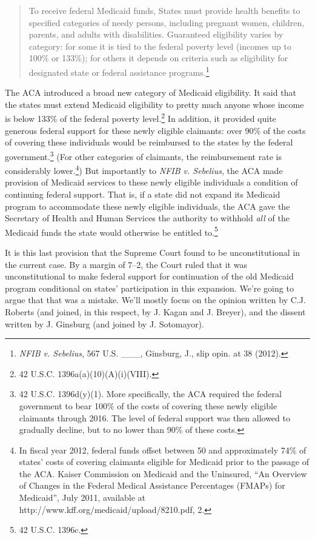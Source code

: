 \begin{quote}
To receive federal Medicaid funds, States must provide health benefits to specified categories of needy persons, including pregnant women, children, parents, and adults with disabilities. Guaranteed eligibility varies by category: for some it is tied to the federal poverty level (incomes up to 100\% or 133\%); for others it depends on criteria such as eligibility for designated state or federal assistance programs.\footnote{\emph{NFIB v. Sebelius}, 567 U.S. \_\_\_, Ginsburg, J., slip opin. at 38 (2012).}
\end{quote}
The ACA introduced a broad new category of Medicaid eligibility. It said that the states must extend Medicaid eligibility to pretty much anyone whose income is below 133\% of the federal poverty level.\footnote{42 U.S.C. \textsection 1396a(a)(10)(A)(i)(VIII).} In addition, it provided quite generous federal support for these newly eligible claimants: over 90\% of the costs of covering these individuals would be reimbursed to the states by the federal government.\footnote{42 U.S.C. \textsection 1396d(y)(1). More specifically, the ACA required the federal government to bear 100\% of the costs of covering these newly eligible claimants through 2016. The level of federal support was then allowed to gradually decline, but to no lower than 90\% of these costs.} (For other categories of claimants, the reimbursement rate is considerably lower.\footnote{In fiscal year 2012, federal funds offset between 50 and approximately 74\% of states' costs of covering claimants eligible for Medicaid prior to the passage of the ACA. Kaiser Commission on Medicaid and the Uninsured, ``An Overview of Changes in the Federal Medical Assistance Percentages (FMAPs) for Medicaid'', July 2011, available at http:/\slash www.kff.org\slash medicaid\slash upload\slash 8210.pdf, 2.}) But importantly to \emph{NFIB v. Sebelius}, the ACA made provision of Medicaid services to these newly eligible individuals a condition of continuing federal support. That is, if a state did not expand its Medicaid program to accommodate these newly eligible individuals, the ACA gave the Secretary of Health and Human Services the authority to withhold \emph{all} of the Medicaid funds the state would otherwise be entitled to.\footnote{42 U.S.C. \textsection 1396c.}

It is this last provision that the Supreme Court found to be unconstitutional in the current case. By a margin of 7--2, the Court ruled that it was unconstitutional to make federal support for continuation of the old Medicaid program conditional on states' participation in this expansion. We're going to argue that that was a mistake. We'll mostly focus on the opinion written by C.J. Roberts (and joined, in this respect, by J. Kagan and J. Breyer), and the dissent written by J. Ginsburg (and joined by J. Sotomayor). 

